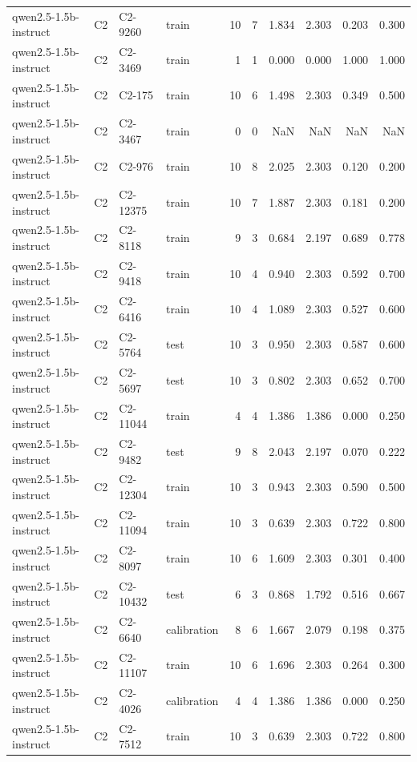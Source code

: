 \begin{table}
\begin{tabular}{llllrrrrrr}
qwen2.5-1.5b-instruct & C2 & C2-9260 & train & 10 & 7 & 1.834 & 2.303 & 0.203 & 0.300 \\
qwen2.5-1.5b-instruct & C2 & C2-3469 & train & 1 & 1 & 0.000 & 0.000 & 1.000 & 1.000 \\
qwen2.5-1.5b-instruct & C2 & C2-175 & train & 10 & 6 & 1.498 & 2.303 & 0.349 & 0.500 \\
qwen2.5-1.5b-instruct & C2 & C2-3467 & train & 0 & 0 & NaN & NaN & NaN & NaN \\
qwen2.5-1.5b-instruct & C2 & C2-976 & train & 10 & 8 & 2.025 & 2.303 & 0.120 & 0.200 \\
qwen2.5-1.5b-instruct & C2 & C2-12375 & train & 10 & 7 & 1.887 & 2.303 & 0.181 & 0.200 \\
qwen2.5-1.5b-instruct & C2 & C2-8118 & train & 9 & 3 & 0.684 & 2.197 & 0.689 & 0.778 \\
qwen2.5-1.5b-instruct & C2 & C2-9418 & train & 10 & 4 & 0.940 & 2.303 & 0.592 & 0.700 \\
qwen2.5-1.5b-instruct & C2 & C2-6416 & train & 10 & 4 & 1.089 & 2.303 & 0.527 & 0.600 \\
qwen2.5-1.5b-instruct & C2 & C2-5764 & test & 10 & 3 & 0.950 & 2.303 & 0.587 & 0.600 \\
qwen2.5-1.5b-instruct & C2 & C2-5697 & test & 10 & 3 & 0.802 & 2.303 & 0.652 & 0.700 \\
qwen2.5-1.5b-instruct & C2 & C2-11044 & train & 4 & 4 & 1.386 & 1.386 & 0.000 & 0.250 \\
qwen2.5-1.5b-instruct & C2 & C2-9482 & test & 9 & 8 & 2.043 & 2.197 & 0.070 & 0.222 \\
qwen2.5-1.5b-instruct & C2 & C2-12304 & train & 10 & 3 & 0.943 & 2.303 & 0.590 & 0.500 \\
qwen2.5-1.5b-instruct & C2 & C2-11094 & train & 10 & 3 & 0.639 & 2.303 & 0.722 & 0.800 \\
qwen2.5-1.5b-instruct & C2 & C2-8097 & train & 10 & 6 & 1.609 & 2.303 & 0.301 & 0.400 \\
qwen2.5-1.5b-instruct & C2 & C2-10432 & test & 6 & 3 & 0.868 & 1.792 & 0.516 & 0.667 \\
qwen2.5-1.5b-instruct & C2 & C2-6640 & calibration & 8 & 6 & 1.667 & 2.079 & 0.198 & 0.375 \\
qwen2.5-1.5b-instruct & C2 & C2-11107 & train & 10 & 6 & 1.696 & 2.303 & 0.264 & 0.300 \\
qwen2.5-1.5b-instruct & C2 & C2-4026 & calibration & 4 & 4 & 1.386 & 1.386 & 0.000 & 0.250 \\
qwen2.5-1.5b-instruct & C2 & C2-7512 & train & 10 & 3 & 0.639 & 2.303 & 0.722 & 0.800 \\

\end{tabular}
\end{table}

